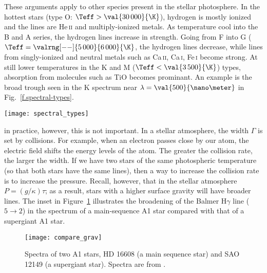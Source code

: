 These arguments apply to other species present in the stellar photosphere.  In the hottest stars (type O: $\Teff > \val{30\,000}{\K}$), hydrogen is mostly ionized and the lines are He\,\textsc{ii} and multiply-ionized metals. As temperature cool into the B and A series, the hydrogen lines increase in strength. Going from F into G ($\Teff = \valrng[--]{5\,000}{6\,000}{\K}$, the hydrogen lines decrease, while lines from singly-ionized and neutral metals such as Ca\,\textsc{ii}, Ca\,\textsc{i}, Fe\,\textsc{i} become strong.  At still lower temperatures in the K and M ($\Teff < \val{3\,500}{\K}$) types, absorption from molecules such as TiO becomes prominant.  An example is the broad trough seen in the K spectrum near $\lambda = \val{500}{\nano\meter}$ in Fig.~\ref{f.spectral-types}.

\begin{figure*}[hb]
\texttt{[image: spectral\_types]}
\caption[Standard stellar types]{\label{f.spectral-types} Spectra from main-sequence stars of spectral types O--K. Data from \protect\citet{Jacoby1984A-library-of-st}.}
\end{figure*}


 in practice, however, this is not important.  In a stellar atmosphere, the width $\Gamma$ is set by collisions.  For example, when an electron passes close by our atom, the electric field shifts the energy levels of the atom.  The greater the collision rate, the larger the width.
If we have two stars of the same photospheric temperature (so that both stars have the same lines), then a way to increase the collision rate is to increase the pressure. Recall, however, that in the stellar atmosphere $P = (g/\kappa)\tau$; as a result, stars with a higher surface gravity will have broader lines. The inset in Figure~\ref{f.compare_grav} illustrates the broadening of the Balmer H$\gamma$ line ($5\to 2$) in the spectrum of a main-sequence A1 star compared with that of a supergiant A1 star.

\begin{figure}[hp]
    \texttt{[image: compare\_grav]}
    \caption[Spectra of two A1 stars]{\label{f.compare_grav}
    Spectra of two A1 stars, HD 16608 (a main sequence star) and SAO 12149 (a supergiant star).  Spectra are from \citet{Jacoby1984A-library-of-st}.
    }
\end{figure}

